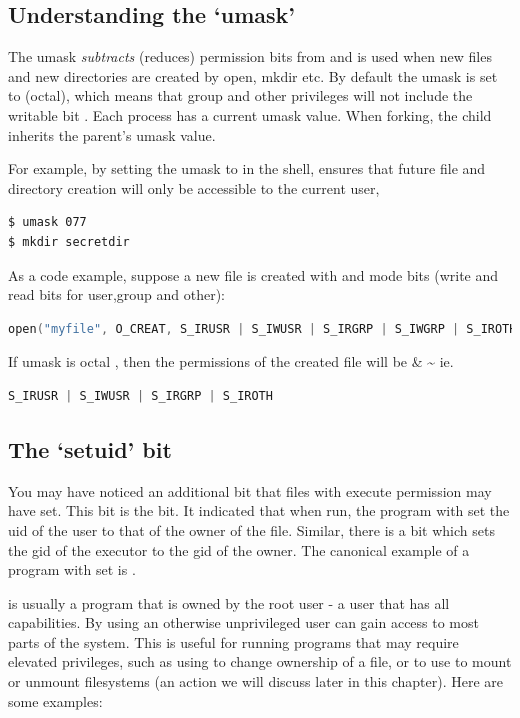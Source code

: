 \subsection{Understanding the `umask'}

The umask \emph{subtracts} (reduces) permission bits from  and is used when new files and new directories are created by open, mkdir etc.
By default the umask is set to  (octal), which means that group and other privileges will not include the writable bit .
Each process has a current umask value.
When forking, the child inherits the parent's umask value.

For example, by setting the umask to  in the shell, ensures that future file and directory creation will only be accessible to the current user,

\begin{verbatim}
$ umask 077
$ mkdir secretdir
\end{verbatim}

As a code example, suppose a new file is created with  and mode bits  (write and read bits for user,group and other):

\begin{lstlisting}[language=C]
open("myfile", O_CREAT, S_IRUSR | S_IWUSR | S_IRGRP | S_IWGRP | S_IROTH | S_IWOTH);
\end{lstlisting}

If umask is octal , then the permissions of the created file will be  \& \textasciitilde{} ie.

\begin{lstlisting}[language=C]
S_IRUSR | S_IWUSR | S_IRGRP | S_IROTH
\end{lstlisting}

\subsection{The `setuid' bit}

You may have noticed an additional bit that files with execute permission may have set.
This bit is the  bit.
It indicated that when run, the program with set the uid of the user to that of the owner of the file.
Similar, there is a  bit which sets the gid of the executor to the gid of the owner.
The canonical example of a program with  set is .

 is usually a program that is owned by the root user - a user that has all capabilities.
By using  an otherwise unprivileged user can gain access to most parts of the system.
This is useful for running programs that may require elevated privileges, such as using  to change ownership of a file, or to use  to mount or unmount filesystems (an action we will discuss later in this chapter).
Here are some examples:

